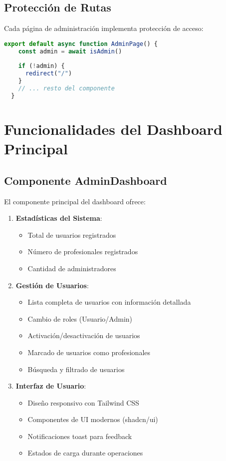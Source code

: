 \documentclass[12pt,a4paper]{article}
\begin{document}
\subsection{Protección de Rutas}

Cada página de administración implementa protección de acceso:

\begin{lstlisting}[language=JavaScript, caption=Protección de rutas en page.tsx]
  export default async function AdminPage() {
    const admin = await isAdmin()
    
    if (!admin) {
      redirect("/")
    }
    // ... resto del componente
  }
\end{lstlisting}

\section{Funcionalidades del Dashboard Principal}

\subsection{Componente AdminDashboard}

El componente principal del dashboard ofrece:

\begin{enumerate}
  \item \textbf{Estadísticas del Sistema}:
  \begin{itemize}
    \item Total de usuarios registrados
    \item Número de profesionales registrados
    \item Cantidad de administradores
  \end{itemize}
  
  \item \textbf{Gestión de Usuarios}:
  \begin{itemize}
    \item Lista completa de usuarios con información detallada
    \item Cambio de roles (Usuario/Admin)
    \item Activación/desactivación de usuarios
    \item Marcado de usuarios como profesionales
    \item Búsqueda y filtrado de usuarios
  \end{itemize}
  
  \item \textbf{Interfaz de Usuario}:
  \begin{itemize}
    \item Diseño responsivo con Tailwind CSS
    \item Componentes de UI modernos (shadcn/ui)
    \item Notificaciones toast para feedback
    \item Estados de carga durante operaciones
  \end{itemize}
\end{enumerate}
\end{document}
